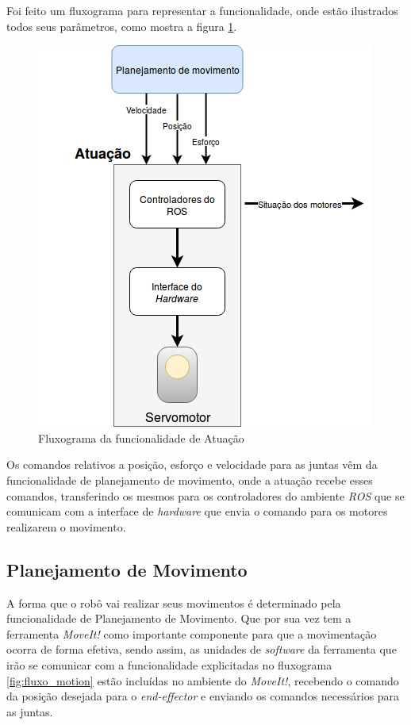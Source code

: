 Foi feito um fluxograma para representar a funcionalidade, onde estão ilustrados todos seus parâmetros, como mostra a figura \ref{fig:flux_atu}.

\begin{figure}[H]
	\centering
	\includegraphics[scale=0.5]{Figures/actuation_depenPORTUGUES.png}
	\caption{Fluxograma da funcionalidade de Atuação}
	\label{fig:flux_atu}
\end{figure}

Os comandos relativos a posição, esforço e velocidade para as juntas vêm da funcionalidade de planejamento de movimento, onde a atuação recebe esses comandos, transferindo os mesmos para os controladores do ambiente \textit{ROS} que se comunicam com a interface de \textit{hardware} que envia o comando para os motores realizarem o movimento.
\subsection{Planejamento de Movimento}\label{sec:plan_mov}
A forma que o robô vai realizar seus movimentos é determinado pela funcionalidade de Planejamento de Movimento. Que por sua vez tem a ferramenta \textit{MoveIt!} como importante componente para que a movimentação ocorra de forma efetiva, sendo assim, as unidades de \textit{software} da ferramenta que irão se comunicar com a funcionalidade explicitadas no fluxograma \ref{fig:fluxo_motion} estão incluídas no ambiente do \textit{MoveIt!}, recebendo o comando da posição desejada para o \textit{end-effector} e enviando os comandos necessários para as juntas. 
	
